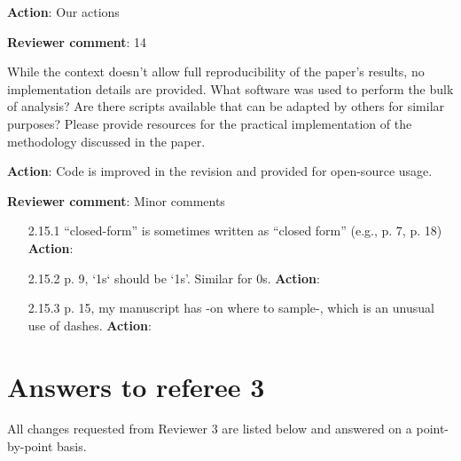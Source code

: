 \documentclass[a4paper]{article}
\newcounter{reviewer}
\def\revcom{\textbf{Reviewer comment}}
\def\action{\textbf{Action}}
\begin{document}
\begin{answers}
\action: Our actions

\item{\revcom:  14}\label{r2c14}

While the context doesn’t allow full reproducibility of the paper’s results, no implementation details are provided. What software was used to perform the bulk of analysis? Are there scripts available that can be adapted by others for similar purposes? Please provide resources for the practical implementation of the methodology discussed in the paper.

\action: Code is improved in the revision and provided for open-source usage.

\item{\revcom: Minor comments}\label{r2cminor}

\begin{itemize}[noitemsep,topsep=0pt,parsep=0pt,partopsep=0pt]

\item[2.15.1] “closed-form” is sometimes written as “closed form” (e.g., p. 7, p. 18)
\action:

\item[2.15.2] p. 9, `1s` should be ‘1s’. Similar for 0s.
\action:

\item[2.15.3] p. 15, my manuscript has -on where to sample-, which is an unusual use of dashes.
\action:
\end{itemize}

\end{answers}

\section*{Answers to referee 3}
All changes requested from Reviewer 3 are listed below and answered on a point-by-point basis.

\setcounter{reviewer}{3}
\end{document}

